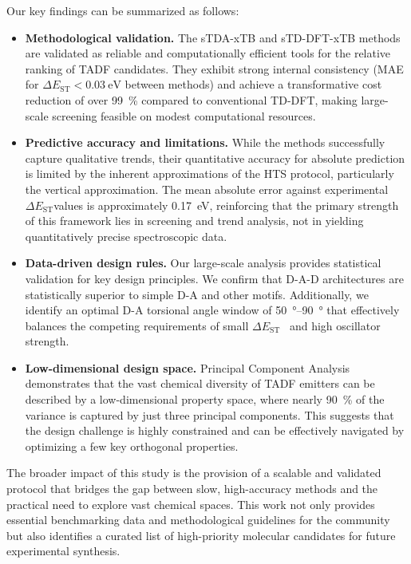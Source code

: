 \documentclass[journal=jcisd8,manuscript=article,keywords=true]{achemso}
\newcommand{\deltaest}{$\Delta E_{\text{ST}}$}
\begin{document}
Our key findings can be summarized as follows:
\begin{itemize}
    \item \textbf{Methodological validation.} The sTDA-xTB and sTD-DFT-xTB methods are validated as reliable and computationally efficient tools for the relative ranking of TADF candidates. They exhibit strong internal consistency (MAE for \deltaest $< \qty{0.03}{\electronvolt}$ between methods) and achieve a transformative cost reduction of over \qty{99}{\percent} compared to conventional TD-DFT, making large-scale screening feasible on modest computational resources.

    \item \textbf{Predictive accuracy and limitations.} While the methods successfully capture qualitative trends, their quantitative accuracy for absolute prediction is limited by the inherent approximations of the HTS protocol, particularly the vertical approximation. The mean absolute error against experimental \deltaest values is approximately \qty{0.17}{\electronvolt}, reinforcing that the primary strength of this framework lies in screening and trend analysis, not in yielding quantitatively precise spectroscopic data.

    \item \textbf{Data-driven design rules.} Our large-scale analysis provides statistical
validation for key design principles. We confirm that D-A-D architectures are
statistically superior to simple D-A and other motifs. Additionally, we identify an optimal
D-A torsional angle window of \qtyrange{50}{90}{\degree} that effectively balances the
competing requirements of small \deltaest~ and high oscillator strength.

    \item \textbf{Low-dimensional design space.} Principal Component Analysis demonstrates that the vast chemical diversity of TADF emitters can be described by a low-dimensional property space, where nearly \qty{90}{\percent} of the variance is captured by just three principal components. This suggests that the design challenge is highly constrained and can be effectively navigated by optimizing a few key orthogonal properties.
\end{itemize}

The broader impact of this study is the provision of a scalable and validated protocol that bridges the gap between slow, high-accuracy methods and the practical need to explore vast chemical spaces. This work not only provides essential benchmarking data and methodological guidelines for the community but also identifies a curated list of high-priority molecular candidates for future experimental synthesis.
\end{document}
